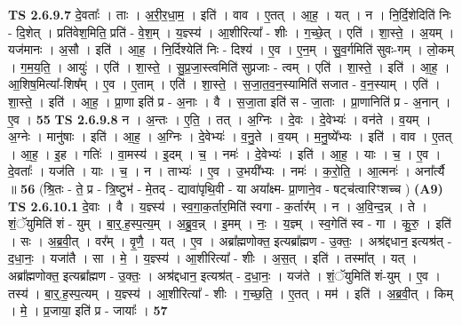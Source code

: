 \documentclass[17pt]{extarticle}
\begin{document}
                  \newline
                                \textbf{ TS 2.6.9.7} \newline
                  दे॒वताः᳚ । ताः । अ॒री॒र॒धा॒म॒ । इति॑ । वाव । ए॒तत् । आ॒ह॒ । यत् । न । नि॒र्दि॒शेदिति॑ निः - दि॒शेत् । प्रति॑वेश॒मिति॒ प्रति॑ - वे॒श॒म् । य॒ज्ञ्स्य॑ । आ॒शीरित्या᳚ - शीः । ग॒च्छे॒त् । एति॑ । शा॒स्ते॒ । अ॒यम् । यज॑मानः । अ॒सौ । इति॑ । आ॒ह॒ । नि॒र्दिश्येति॑ निः - दिश्य॑ । ए॒व । ए॒न॒म् । सु॒व॒र्गमिति॑ सुवः-गम् । लो॒कम् । ग॒म॒य॒ति॒ । आयुः॑ । एति॑ । शा॒स्ते॒ । सु॒प्र॒जा॒स्त्वमिति॑ सुप्रजाः - त्वम् । एति॑ । शा॒स्ते॒ । इति॑ । आ॒ह॒ । आ॒शिष॒मित्या᳚-शिष᳚म् । ए॒व । ए॒ताम् । एति॑ । शा॒स्ते॒ । स॒जा॒त॒व॒न॒स्यामिति॑ सजात - व॒न॒स्याम् । एति॑ । शा॒स्ते॒ । इति॑ । आ॒ह॒ । प्रा॒णा इति॑ प्र - अ॒नाः । वै । स॒जा॒ता इति॑ स - जा॒ताः । प्रा॒णानिति॑ प्र - अ॒नान् । ए॒व । \textbf{  55} \newline
                  \newline
                                \textbf{ TS 2.6.9.8} \newline
                  न । अ॒न्तः । ए॒ति॒ । तत् । अ॒ग्निः । दे॒वः । दे॒वेभ्यः॑ । वन॑ते । व॒यम् । अ॒ग्नेः । मानु॑षाः । इति॑ । आ॒ह॒ । अ॒ग्निः । दे॒वेभ्यः॑ । व॒नु॒ते । व॒यम् । म॒नु॒ष्ये᳚भ्यः । इति॑ । वाव । ए॒तत् । आ॒ह॒ । इ॒ह । गतिः॑ । वा॒मस्य॑ । इ॒दम् । च॒ । नमः॑ । दे॒वेभ्यः॑ । इति॑ । आ॒ह॒ । याः । च॒ । ए॒व । दे॒वताः᳚ । यज॑ति । याः । च॒ । न । ताभ्यः॑ । ए॒व । उ॒भयी᳚भ्यः । नमः॑ । क॒रो॒ति॒ । आ॒त्मनः॑ । अना᳚र्त्यै ॥ \textbf{  56} \newline
                  \newline
                      (श्रि॒तः - ते॒ प्र - त्रि॒ष्टुभ॑ - मे॒तद् - द्यावा॑पृथि॒वी - या अया᳚क्ष्म- प्रा॒णाने॒व - षट्च॑त्वारिꣳशच्च ) \textbf{(A9)} \newline \newline
                                \textbf{ TS 2.6.10.1} \newline
                  दे॒वाः । वै । य॒ज्ञ्स्य॑ । स्व॒गा॒क॒र्तार॒मिति॑ स्वगा - क॒र्तार᳚म् । न । अ॒वि॒न्द॒न्न् । ते । शं॒ॅयुमिति॑ शं - युम् । बा॒र्॒.ह॒स्प॒त्य॒म् । अ॒ब्रु॒व॒न्न् । इ॒मम् । नः॒ । य॒ज्ञ्म् । स्व॒गेति॑ स्व - गा । कु॒रु॒ । इति॑ । सः । अ॒ब्र॒वी॒त् । वर᳚म् । वृ॒णै॒ । यत् । ए॒व । अब्रा᳚ह्मणोक्त॒ इत्यब्रा᳚ह्मण - उ॒क्तः॒ । अश्र॑द्दधान॒ इत्यश्र॑त् - द॒धा॒नः॒ । यजा॑तै । सा । मे॒ । य॒ज्ञ्स्य॑ । आ॒शीरित्या᳚ - शीः । अ॒स॒त् । इति॑ । तस्मा᳚त् । यत् । अब्रा᳚ह्मणोक्त॒ इत्यब्रा᳚ह्मण - उ॒क्तः॒ । अश्र॑द्दधान॒ इत्यश्र॑त् - द॒धा॒नः॒ । यज॑ते । शं॒ॅयुमिति॑ शं-युम् । ए॒व । तस्य॑ । बा॒र्॒.ह॒स्प॒त्यम् । य॒ज्ञ्स्य॑ । आ॒शीरित्या᳚ - शीः । ग॒च्छ॒ति॒ । ए॒तत् । मम॑ । इति॑ । अ॒ब्र॒वी॒त् । किम् । मे॒ । प्र॒जाया॒ इति॑ प्र - जायाः᳚ । \textbf{  57} \newline
\end{document}
